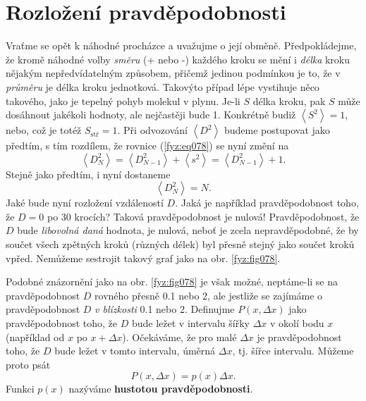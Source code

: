   \section{Rozložení pravděpodobnosti}
    Vraťme se opět k náhodné procházce a uvažujme o její obměně. Předpokládejme, že kromě náhodné 
    volby \emph{směru} (+ nebo -) každého kroku se mění i \emph{délka} kroku nějakým 
    nepředvídatelným způsobem, přičemž jedinou podmínkou je to, že v \emph{průměru} je délka kroku 
    jednotková. Takovýto případ lépe vystihuje něco takového, jako je tepelný pohyb molekul v 
    plynu. Je-li \(S\) délka kroku, pak \(S\) může dosáhnout jakékoli hodnoty, ale nejčastěji bude 
     \num{1}. Konkrétně budiž \(\left\langle S^2\right\rangle = 1\), nebo, což je totéž 
    \(S_{\text{stř}} = 1\). Při odvozování \(\left\langle D^2\right\rangle\) budeme postupovat jako 
    předtím, s tím rozdílem, že rovnice (\ref{fyz:eq078}) se nyní změní na
    \begin{equation}\label{fyz:eq086}
      \left\langle D_N^2\right\rangle 
        = \left\langle D_{N-1}^2\right\rangle + \left\langle s^2\right\rangle
        = \left\langle D_{N-1}^2\right\rangle + 1.
    \end{equation}
    Stejně jako předtím, i nyní dostaneme
    \begin{equation}\label{fyz:eq087}
      \left\langle D_N^2\right\rangle = N.
    \end{equation}
    Jaké bude nyní rozložení vzdáleností \(D\). Jaká je například pravděpodobnost toho, že \(D = 
    0\) po \num{30} krocích? Taková pravděpodobnost je nulová! Pravděpodobnost, že \(D\) bude 
    \emph{libovolná daná} hodnota, je nulová, neboť je zcela nepravděpodobné, že by součet všech 
    zpětných kroků (různých délek) byl přesně stejný jako součet kroků vpřed. Nemůžeme sestrojit 
    takový graf jako na obr. \ref{fyz:fig078}.
    
    Podobné znázornění jako na obr. \ref{fyz:fig078} je však možné, neptáme-li se na 
    pravděpodobnost \(D\) rovného přesně \num{0.1} nebo \num{2}, ale jestliže se zajímáme o 
    pravděpodobnost \(D\) \emph{v blízkosti} \num{0.1} nebo \num{2}. Definujme \(P(x, \Delta x)\) 
    jako pravděpodobnost toho, že \(D\) bude ležet v intervalu šířky \(\Delta x\) v okolí bodu 
    \(x\) (například od \(x\) po \(x + \Delta x\)). Očekáváme, že pro malé \(\Delta x\) je 
    pravděpodobnost toho, že \(D\) bude ležet v tomto intervalu, úměrná \(\Delta x\), tj. šířce 
    intervalu. Můžeme proto psát
    \begin{equation}\label{fyz:eq088}
      P(x,\Delta x) = p(x)\Delta x.
    \end{equation}
    Funkci \(p(x)\) nazýváme \textbf{hustotou pravděpodobnosti}.
    
